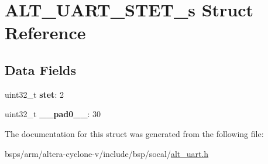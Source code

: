 \hypertarget{structALT__UART__STET__s}{}\section{A\+L\+T\+\_\+\+U\+A\+R\+T\+\_\+\+S\+T\+E\+T\+\_\+s Struct Reference}
\label{structALT__UART__STET__s}
\subsection*{Data Fields}
\begin{DoxyCompactItemize}
\item 
\mbox{\label{structALT__UART__STET__s_aca2d590450ad40618b160b7e6949c4f3}} 
uint32\+\_\+t {\bfseries stet}\+: 2
\item 
\mbox{\label{structALT__UART__STET__s_a06bf04d51a43253358647b4d4123fea8}} 
uint32\+\_\+t {\bfseries \+\_\+\+\_\+pad0\+\_\+\+\_\+}\+: 30
\end{DoxyCompactItemize}


The documentation for this struct was generated from the following file\+:\begin{DoxyCompactItemize}
\item 
bsps/arm/altera-\/cyclone-\/v/include/bsp/socal/\mbox{\hyperlink{alt__uart_8h}{alt\+\_\+uart.\+h}}\end{DoxyCompactItemize}
